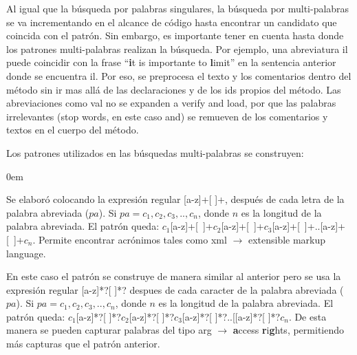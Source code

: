 \documentclass[a4paper,12pt]{report}
\begin{document}
Al igual que la búsqueda por palabras singulares, la búsqueda por multi-palabras se va incrementando en el alcance de código hasta encontrar un candidato que coincida con el patrón. Sin embargo, es importante tener en cuenta hasta donde los patrones multi-palabras realizan la búsqueda. Por ejemplo, una abreviatura \textsf{il} puede coincidir con la frase “\textbf{i}t is importante to \textbf{l}imit” en la sentencia anterior donde se encuentra \textsf{il}. Por eso, se preprocesa el texto y los comentarios dentro del método sin ir mas allá de las declaraciones y de los ids propios del método.
 Las abreviaciones como \textsf{val} no se expanden a \textsf{verify and load}, por que las palabras irrelevantes (stop words, en este caso \textsf{and}) se remueven de los comentarios y textos en el cuerpo del método.

Los patrones utilizados en las búsquedas multi-palabras se construyen:

\begin{description}
\itemsep0em%
\item[Patrón acrónimo:] Se elaboró colocando la expresión regular [a-z]+[ ]+, después de cada letra de la palabra abreviada ($pa$). Si $pa=c_{1},c_{2},c_{3},..,c_{n}$, donde $n$ es la longitud de la palabra abreviada. El patrón queda: \mbox{$c_{1}$[a-z]+[ ]+$c_{2}$[a-z]+[ ]+$c_{3}$[a-z]+[ ]+..[a-z]+[ ]+$c_{n}$}. Permite encontrar acrónimos tales como \textsf{xml} $\rightarrow$ \textsf{extensible markup language}.

\item[Patrón de Combinación de Palabras:] En este caso el patrón se construye de manera similar al anterior pero se usa la expresión regular [a-z]*?[ ]*? despues de cada caracter de la palabra abreviada ($pa$). Si $pa=c_{1},c_{2},c_{3},..,c_{n}$, donde $n$ es la longitud de la palabra abreviada. El patrón queda: $c_{1}$[a-z]*?[ ]*?$c_{2}$[a-z]*?[ ]*?$c_{3}$[a-z]*?[ ]*?..[[a-z]*?[ ]*?$c_{n}$. De esta manera se pueden capturar palabras del tipo \textsf{arg} $\rightarrow$ \textsf{\textbf{a}ccess \textbf{r}i\textbf{g}hts}, permitiendo más capturas que el patrón anterior.
\end{description}


\end{document}
